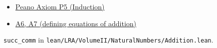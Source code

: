 \begin{dependencies}
\begin{itemize}
  \item \hyperref[ax:landau-peano]{Peano Axiom P5 (Induction)}
  \item \hyperref[thm:landau-addition-exists-unique]{A6, A7 (defining equations of addition)}
\end{itemize}

\end{dependencies}

\begin{remark*}
\texttt{succ\_comm} in
\texttt{lean/LRA/VolumeII/NaturalNumbers/Addition.lean}.
\end{remark*}

\clearpage
